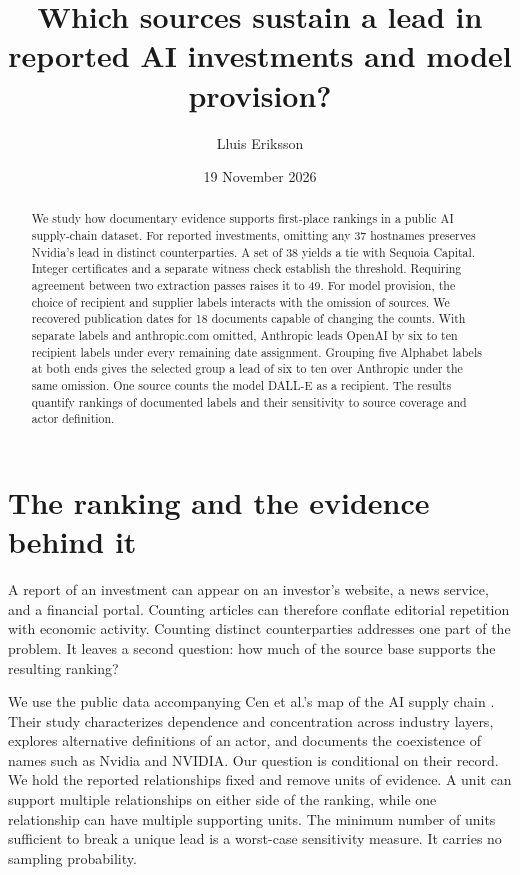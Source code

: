 \documentclass[11pt]{article}
\title{Which sources sustain a lead in reported AI investments and model provision?}
\author{Lluis Eriksson}
\date{19 November 2026}
\begin{document}
\maketitle
\begin{abstract}
We study how documentary evidence supports first-place rankings in a public AI supply-chain dataset. For reported investments, omitting any 37 hostnames preserves Nvidia's lead in distinct counterparties. A set of 38 yields a tie with Sequoia Capital. Integer certificates and a separate witness check establish the threshold. Requiring agreement between two extraction passes raises it to 49. For model provision, the choice of recipient and supplier labels interacts with the omission of sources. We recovered publication dates for 18 documents capable of changing the counts. With separate labels and anthropic.com omitted, Anthropic leads OpenAI by six to ten recipient labels under every remaining date assignment. Grouping five Alphabet labels at both ends gives the selected group a lead of six to ten over Anthropic under the same omission. One source counts the model DALL-E as a recipient. The results quantify rankings of documented labels and their sensitivity to source coverage and actor definition.
\end{abstract}

\section{The ranking and the evidence behind it}
A report of an investment can appear on an investor's website, a news service, and a financial portal. Counting articles can therefore conflate editorial repetition with economic activity. Counting distinct counterparties addresses one part of the problem. It leaves a second question: how much of the source base supports the resulting ranking?

We use the public data accompanying Cen et al.'s map of the AI supply chain \cite{cen,data}. Their study characterizes dependence and concentration across industry layers, explores alternative definitions of an actor, and documents the coexistence of names such as Nvidia and NVIDIA. Our question is conditional on their record. We hold the reported relationships fixed and remove units of evidence. A unit can support multiple relationships on either side of the ranking, while one relationship can have multiple supporting units. The minimum number of units sufficient to break a unique lead is a worst-case sensitivity measure. It carries no sampling probability.
\end{document}
